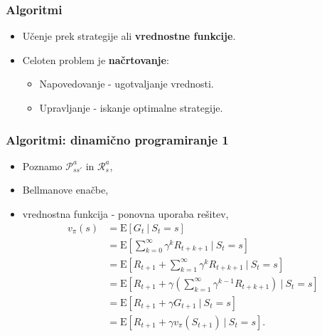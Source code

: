 \documentclass{beamer}    %
\begin{document}
\begin{frame}
    \frametitle{Algoritmi}
    \begin{itemize}
        \item Učenje prek strategije ali \textbf{vrednostne funkcije}. 
        \item Celoten problem je \textbf{načrtovanje}:
        \begin{itemize}
            \item Napovedovanje - ugotvaljanje vrednosti.
            \item Upravljanje - iskanje optimalne strategije. 
        \end{itemize}
    \end{itemize}
\end{frame}


\begin{frame}
    \frametitle{Algoritmi: dinamično programiranje 1}
    \begin{itemize}
        \item Poznamo $\mathcal{P}_{ss'}^a$ in $\mathcal{R}_s^a$, 
        \item Bellmanove enačbe, 
        \item vrednostna funkcija - ponovna uporaba rešitev,  
        \begin{align*}
            v_\pi(s) &= \mathrm{E} [G_t~|~S_t = s] \\
                 &= \mathrm{E} [\sum_{k=0}^\infty \gamma^k R_{t + k + 1}~|~S_t = s] \\
                 &= \mathrm{E} [R_{t+1} + \sum_{k=1}^\infty \gamma^k R_{t + k + 1}~|~S_t = s] \\
                 &= \mathrm{E} [R_{t+1} + \gamma(\sum_{k=1}^\infty \gamma^{k-1} R_{t + k + 1})~|~S_t = s] \\
                 &= \mathrm{E} [R_{t+1} + \gamma G_{t+1}~|~S_t = s] \\
                 &= \mathrm{E} [R_{t+1} + \gamma v_\pi(S_{t+1})~|~S_t = s].
        \end{align*}
    \end{itemize}
\end{frame}
\end{document}
